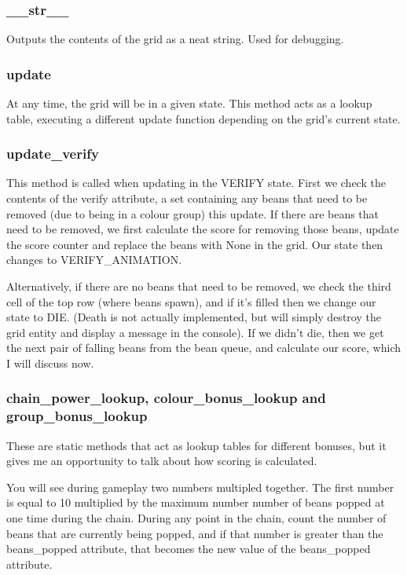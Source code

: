 \documentclass{report}
\begin{document}
\subsubsection{\_\_str\_\_}

Outputs the contents of the grid as a neat string. Used for debugging.

\subsubsection{update}

At any time, the grid will be in a given state. This method acts as a lookup table, executing a different update function depending on the grid's current state.

\subsubsection{update\_verify}

This method is called when updating in the VERIFY state. First we check the contents of the verify attribute, a set containing any beans that need to be removed (due to being in a colour group) this update. If there are beans that need to be removed, we first calculate the score for removing those beans, update the score counter and replace the beans with None in the grid. Our state then changes to VERIFY\_ANIMATION.

Alternatively, if there are no beans that need to be removed, we check the third cell of the top row (where beans spawn), and if it's filled then we change our state to DIE. (Death is not actually implemented, but will simply destroy the grid entity and display a message in the console). If we didn't die, then we get the next pair of falling beans from the bean queue, and calculate our score, which I will discuss now.

\subsubsection{chain\_power\_lookup, colour\_bonus\_lookup and group\_bonus\_lookup}

These are static methods that act as lookup tables for different bonuses, but it gives me an opportunity to talk about how scoring is calculated.

You will see during gameplay two numbers multipled together. The first number is equal to 10 multiplied by the maximum number number of beans popped at one time during the chain. During any point in the chain, count the number of beans that are currently being popped, and if that number is greater than the beans\_popped attribute, that becomes the new value of the beans\_popped attribute.
\end{document}
